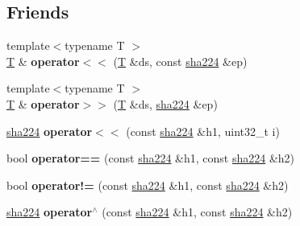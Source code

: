 \subsection*{Friends}
\begin{DoxyCompactItemize}
\item 
\mbox{\label{classfc_1_1sha224_aac01e693a7d530d3f4490857224afc5c}} 
{\footnotesize template$<$typename T $>$ }\\\mbox{\hyperlink{struct_t}{T}} \& {\bfseries operator$<$$<$} (\mbox{\hyperlink{struct_t}{T}} \&ds, const \mbox{\hyperlink{classfc_1_1sha224}{sha224}} \&ep)
\item 
\mbox{\label{classfc_1_1sha224_ad5c569ab1963f08041de2d7347cb18a6}} 
{\footnotesize template$<$typename T $>$ }\\\mbox{\hyperlink{struct_t}{T}} \& {\bfseries operator$>$$>$} (\mbox{\hyperlink{struct_t}{T}} \&ds, \mbox{\hyperlink{classfc_1_1sha224}{sha224}} \&ep)
\item 
\mbox{\label{classfc_1_1sha224_a3a78fb7b9fd8d025d00b7e9f402cc497}} 
\mbox{\hyperlink{classfc_1_1sha224}{sha224}} {\bfseries operator$<$$<$} (const \mbox{\hyperlink{classfc_1_1sha224}{sha224}} \&h1, uint32\+\_\+t i)
\item 
\mbox{\label{classfc_1_1sha224_a1a0b7b54c6e6862c90f0fc3f35c0b7ac}} 
bool {\bfseries operator==} (const \mbox{\hyperlink{classfc_1_1sha224}{sha224}} \&h1, const \mbox{\hyperlink{classfc_1_1sha224}{sha224}} \&h2)
\item 
\mbox{\label{classfc_1_1sha224_a53ec7c3d1dcdbb1a7c894a2eb5e65b9f}} 
bool {\bfseries operator!=} (const \mbox{\hyperlink{classfc_1_1sha224}{sha224}} \&h1, const \mbox{\hyperlink{classfc_1_1sha224}{sha224}} \&h2)
\item 
\mbox{\label{classfc_1_1sha224_ac8de6fb6143a6ac0651b5a609f8e0461}} 
\mbox{\hyperlink{classfc_1_1sha224}{sha224}} {\bfseries operator$^\wedge$} (const \mbox{\hyperlink{classfc_1_1sha224}{sha224}} \&h1, const \mbox{\hyperlink{classfc_1_1sha224}{sha224}} \&h2)
\item 
\mbox{\label{classfc_1_1sha224_aee14b1d50944d18f5a5945e63caf63c8}} 

\end{DoxyCompactItemize}
